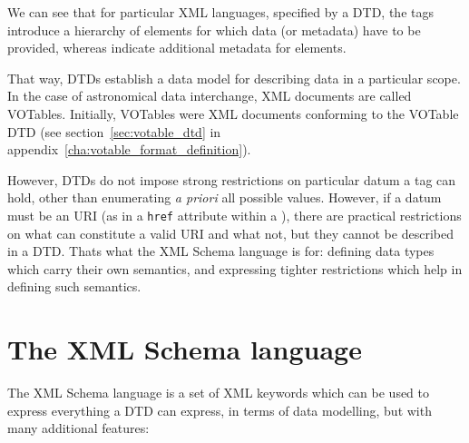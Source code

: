 		 We can see that for particular XML languages, specified by
		a DTD, the  tags introduce a
		hierarchy of elements for which data (or metadata) have to
		be provided, whereas  indicate
		additional metadata for elements.
		
		 That way, DTDs establish a data model for describing data
		in a particular scope. In the case of astronomical data
		interchange, XML documents are called VOTables. Initially,
		VOTables were XML documents conforming to the VOTable DTD
		(see section~\ref{sec:votable_dtd} in
		appendix~\ref{cha:votable_format_definition}).
		
		 However, DTDs do not impose strong restrictions on
		particular datum a tag can hold, other than enumerating
		\emph{a priori} all possible values. However, if a datum
		must be an URI (as in a \texttt{href} attribute within a
		), there are practical restrictions on what
		can constitute a valid URI and what not, but they cannot be
		described in a DTD. Thats what the XML Schema language is
		for: defining data types which carry their own semantics,
		and expressing tighter restrictions which help in defining
		such semantics.
	
	\section{The XML Schema language} %
	\label{sec:xml_schema}
		
		The XML Schema language is a set of XML keywords which can
		be used to express everything a DTD can express, in terms
		of data modelling, but with many additional features:
		
